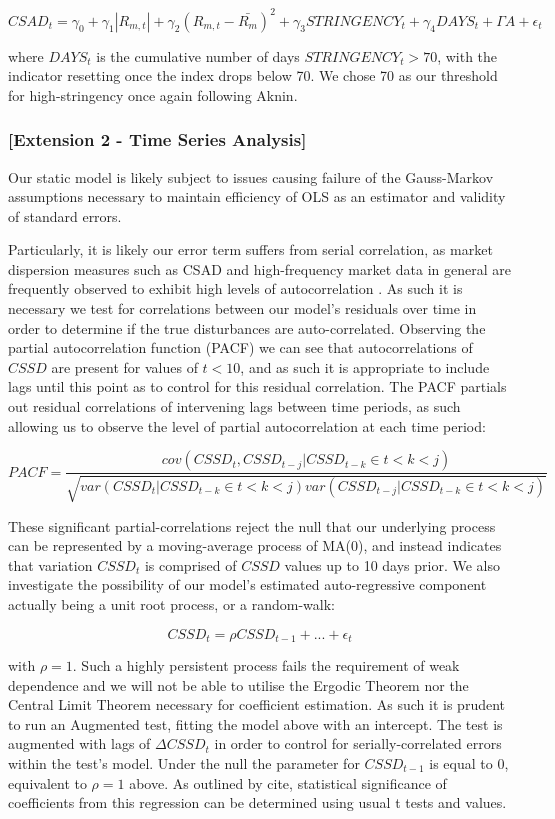 \documentclass[12pt]{article}
\numberwithin{table}{section}   %
\begin{document}
\begin{equation}\label{model-4}
CSAD_t=\gamma_0+\gamma_1 |R_{m,t}|+\gamma_2 (R_{m,t}-\bar{R_m})^2+\gamma_3STRINGENCY_t+\gamma_4DAYS_t+\Gamma{A}+\epsilon_t
\end{equation}

where $DAYS_t$ is the cumulative number of days $STRINGENCY_t>70$, with the indicator resetting once the index drops below 70. We chose 70 as our threshold for high-stringency once again following Aknin.

\subsubsection*{[Extension 2 - Time Series Analysis]}

Our static model is likely subject to issues causing failure of the Gauss-Markov assumptions necessary to maintain efficiency of OLS as an estimator and validity of standard errors. 

Particularly, it is likely our error term suffers from serial correlation, as market dispersion measures such as CSAD and high-frequency market data in general are frequently observed to exhibit high levels of autocorrelation \citep{cck}. As such it is necessary we test for correlations between our model’s residuals over time in order to determine if the true disturbances are auto-correlated. Observing the partial autocorrelation function (PACF) we can see that autocorrelations of $CSSD$ are present for values of $t<10$, and as such it is appropriate to include lags until this point as to control for this residual correlation. The PACF partials out residual correlations of intervening lags between time periods, as such allowing us to observe the level of partial autocorrelation at each time period:

$$
PACF=\frac{cov(CSSD_t,CSSD_{t-j}|CSSD_{t-k}\in{t<k<j})}{\sqrt{var(CSSD_t|CSSD_{t-k}\in{t<k<j})var(CSSD_{t-j}|CSSD_{t-k}\in{t<k<j})}}
$$

These significant partial-correlations reject the null that our underlying process can be represented by a moving-average process of MA(0), and instead indicates that variation $CSSD_t$ is comprised of $CSSD$ values up to 10 days prior. We also investigate the possibility of our model’s estimated auto-regressive component actually being a unit root process, or a random-walk:

$$
CSSD_t=\rho{CSSD_{t-1}}+...+\epsilon_t
$$

with $\rho=1$. Such a highly persistent process fails the requirement of weak dependence and we will not be able to utilise the Ergodic Theorem nor the Central Limit Theorem necessary for coefficient estimation. As such it is prudent to run an Augmented \citet{dfuller} test, fitting the model above with an intercept. The test is augmented with lags of $\Delta{CSSD_t}$ in order to control for serially-correlated errors within the test’s model. Under the null the parameter for $CSSD_{t-1}$ is equal to 0, equivalent to $\rho=1$ above. As outlined by cite, statistical significance of coefficients from this regression can be determined using usual t tests and values.
\end{document}
